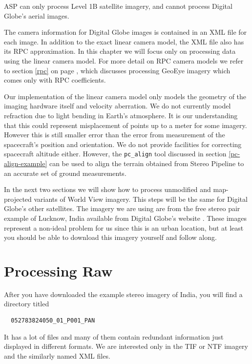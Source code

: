 ASP can only process Level 1B satellite imagery, and cannot process
Digital Globe's aerial images.

The camera information for Digital Globe images is contained in an XML
file for each image. In addition to the exact linear camera model, the
XML file also has its RPC approximation. In this chapter we will focus
only on processing data using the linear camera model.  For more detail
on RPC camera models we refer to section \ref{rpc} on page
\pageref{rpc}, which discusses processing GeoEye imagery which comes
only with RPC coefficients.

Our implementation of the linear camera model only
models the geometry of the imaging hardware itself and velocity
aberration. We do not currently model refraction due to light bending
in Earth's atmosphere. It is our understanding that this could
represent misplacement of points up to a meter for some
imagery. However this is still smaller error than the error from
measurement of the spacecraft's position and orientation. We do not
provide facilities for correcting spacecraft altitude either. However,
the \texttt{pc\_align}
tool discussed in section \ref{pc-align-example} can be used to align
the terrain obtained from Stereo Pipeline to an accurate set of ground
measurements.

In the next two sections we will show how to process unmodified and
map-projected variants of World View imagery. This steps will be the
same for Digital Globe's other satellites. The imagery we are using are
from the free stereo pair example of Lucknow, India available from
Digital Globe's website \cite{digital-globe:samples}. These images
represent a non-ideal problem for us since this is an urban location,
but at least you should be able to download this imagery yourself and
follow along.

\section{Processing Raw}
\label{rawdg}

After you have downloaded the example stereo imagery of India, you
will find a directory titled

\begin{verbatim}
  052783824050_01_P001_PAN
\end{verbatim}

It has a lot of files and many of them contain redundant information
just displayed in different formats. We are interested only in the TIF
or NTF imagery and the similarly named XML files.

